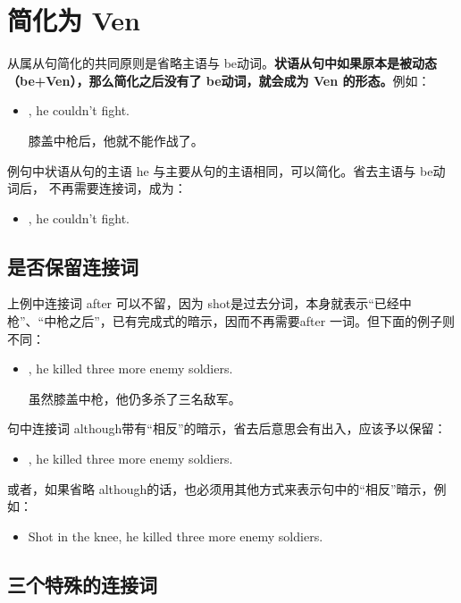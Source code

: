 \section{简化为 Ven}

从属从句简化的共同原则是省略主语与 be动词。\textbf{状语从句中如果原本是被动态
  （be+Ven），那么简化之后没有了 be动词，就会成为 Ven 的形态。}例如：

\begin{itemize}
\item {}, he couldn't fight.

  膝盖中枪后，他就不能作战了。
\end{itemize}
例句中状语从句的主语 he 与主要从句的主语相同，可以简化。省去主语与 be动词后，
不再需要连接词，成为：
\begin{itemize}
\item {}, he couldn't fight.
\end{itemize}

\subsection{是否保留连接词}

上例中连接词 after 可以不留，因为 shot是过去分词，本身就表示“已经中
枪”、“中枪之后”，已有完成式的暗示，因而不再需要after 一词。但下面的例子则
不同：
\begin{itemize}
\item {}, he killed three more enemy soldiers.

  虽然膝盖中枪，他仍多杀了三名敌军。
\end{itemize}
句中连接词 although带有“相反”的暗示，省去后意思会有出入，应该予以保留：
\begin{itemize}
\item {}, he killed three more enemy soldiers.
\end{itemize}
或者，如果省略 although的话，也必须用其他方式来表示句中的“相反”暗示，例如：
\begin{itemize}
\item Shot in the knee, he  killed three more enemy soldiers.
\end{itemize}

\subsection{三个特殊的连接词}

